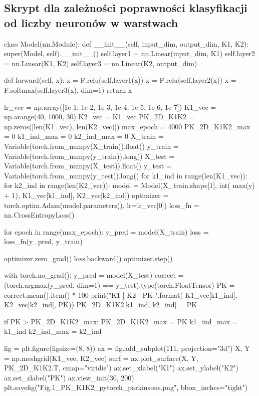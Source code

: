 \documentclass{article}
\begin{document}
\subsection{Skrypt dla zależności poprawności klasyfikacji od liczby neuronów w warstwach}
\begin{python}
    class Model(nn.Module):
    def __init__(self, input_dim, output_dim, K1, K2):
    super(Model, self).__init__()
    self.layer1 = nn.Linear(input_dim, K1)
    self.layer2 = nn.Linear(K1, K2)
    self.layer3 = nn.Linear(K2, output_dim)

    def forward(self, x):
    x = F.relu(self.layer1(x))
    x = F.relu(self.layer2(x))
    x = F.softmax(self.layer3(x), dim=1)
    return x


    lr_vec = np.array([1e-1, 1e-2, 1e-3, 1e-4, 1e-5, 1e-6, 1e-7])
    K1_vec = np.arange(40, 1000, 30)
    K2_vec = K1_vec
    PK_2D_K1K2 = np.zeros([len(K1_vec), len(K2_vec)])
    max_epoch = 4000
    PK_2D_K1K2_max = 0
    k1_ind_max = 0
    k2_ind_max = 0
    X_train = Variable(torch.from_numpy(X_train)).float()
    y_train = Variable(torch.from_numpy(y_train)).long()
    X_test = Variable(torch.from_numpy(X_test)).float()
    y_test = Variable(torch.from_numpy(y_test)).long()
    for k1_ind in range(len(K1_vec)):
    for k2_ind in range(len(K2_vec)):
    model = Model(X_train.shape[1], int(
    max(y) + 1), K1_vec[k1_ind], K2_vec[k2_ind])
    optimizer = torch.optim.Adam(model.parameters(), lr=lr_vec[0])
    loss_fn = nn.CrossEntropyLoss()

    for epoch in range(max_epoch):
    y_pred = model(X_train)
    loss = loss_fn(y_pred, y_train)

    optimizer.zero_grad()
    loss.backward()
    optimizer.step()

    with torch.no_grad():
    y_pred = model(X_test)
    correct = (torch.argmax(y_pred, dim=1) ==
    y_test).type(torch.FloatTensor)
    PK = correct.mean().item() * 100
    print("K1 {} | K2 {} | PK {} ".format(
    K1_vec[k1_ind], K2_vec[k2_ind], PK))
    PK_2D_K1K2[k1_ind, k2_ind] = PK

    if PK > PK_2D_K1K2_max:
    PK_2D_K1K2_max = PK
    k1_ind_max = k1_ind
    k2_ind_max = k2_ind

    fig = plt.figure(figsize=(8, 8))
    ax = fig.add_subplot(111, projection="3d")
    X, Y = np.meshgrid(K1_vec, K2_vec)
    surf = ax.plot_surface(X, Y, PK_2D_K1K2.T, cmap="viridis")
    ax.set_xlabel("K1")
    ax.set_ylabel("K2")
    ax.set_zlabel("PK")
    ax.view_init(30, 200)
    plt.savefig("Fig.1_PK_K1K2_pytorch_parkinsons.png", bbox_inches="tight")

\end{python}
\end{document}
